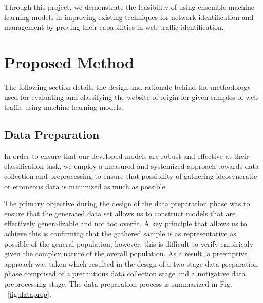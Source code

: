 \documentclass[10pt,sigconf,letterpaper,nonacm]{acmart}
\begin{document}
Through this project, we demonstrate the feasibility of using ensemble machine learning models in improving existing techniques for network identification and management by proving their capabilities in web traffic identification.


\section{Proposed Method}

The following section details the design and rationale behind the methodology used for evaluating and classifying the website of origin for given samples of web traffic using machine learning models.

\subsection{Data Preparation}

In order to ensure that our developed models are robust and effective at their classification task, we employ a measured and systemized approach towards data collection and preprocessing to ensure that possibility of gathering ideosyncratic or erroneous data is minimized as much as possible.

The primary objective during the design of the data preparation phase was to ensure that the generated data set allows us to construct models that are effectively generalizable and not too overfit.
A key principle that allows us to achieve this is confirming that the gathered sample is as representative as possible of the general population; however, this is difficult to verify empiricaly given the complex nature of the overall population.
As a result, a preemptive approach was taken which resulted in the design of a two-stage data preparation phase comprised of a precautious data collection stage and a mitigative data preprocessing stage.
The data preparation process is summarized in Fig. ~\ref{fig:dataprep}.
\end{document}
